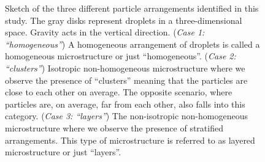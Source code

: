 \begin{figure}
\hfill
\caption{Sketch of the three different particle arrangements identified in this study.
The gray disks represent droplets in a three-dimensional space.
Gravity acts in the vertical direction.
(\textit{Case 1: ``homogeneous''}) A homogeneous arrangement of droplets is called a homogeneous microstructure or just ``homogeneous''.
(\textit{Case 2: ``clusters''}) Isotropic non-homogeneous microstructure where we observe the presence of ``clusters'' meaning that the particles are close to each other on average.
The opposite scenario, where particles are, on average, far from each other, also falls into this category.
(\textit{Case 3: ``layers''}) The non-isotropic non-homogeneous microstructure where we observe the presence of stratified arrangements.
This type of microstructure is referred to as layered microstructure or just ``layers''.
}
\label{fig:scheme_clusters}
\end{figure}
